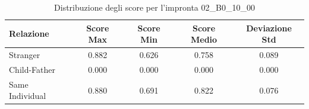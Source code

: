 \begin{table}[htbp]
\centering
\caption{Distribuzione degli score per l'impronta 02\_B0\_10\_00}
\label{tab:scores_02_B0_10_00}
\begin{tabular}{|l|c|c|c|c|}
\hline
\textbf{Relazione} & \textbf{Score Max} & \textbf{Score Min} & \textbf{Score Medio} & \textbf{Deviazione Std} \\
\hline
Stranger & 0.882 & 0.626 & 0.758 & 0.089 \\
\hline
Child-Father & 0.000 & 0.000 & 0.000 & 0.000 \\
\hline
Same Individual & 0.880 & 0.691 & 0.822 & 0.076 \\
\hline
\end{tabular}
\end{table}

